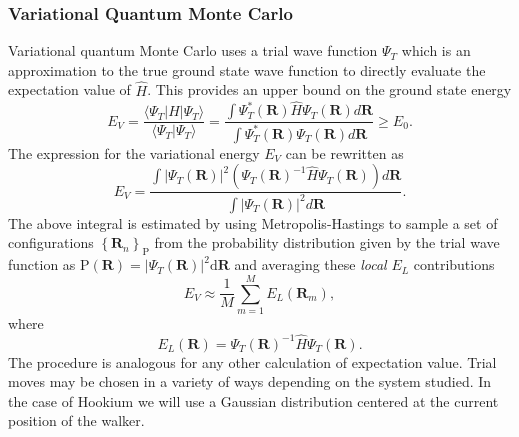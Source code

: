 \subsubsection{Variational Quantum Monte Carlo}
Variational quantum Monte Carlo uses a trial wave function $\Psi_{T}$ which is an approximation to the true ground state wave function to directly evaluate the expectation value of $\hat H$. This provides an upper bound on the ground state energy
\begin{equation}
	\label{eq:variational_princ}
	E_{V}=\frac{\langle \Psi_{T} | H | \Psi_{T} \rangle}{\langle \Psi_{T} | \Psi_{T} \rangle}
	=\frac{\int \Psi_{T}^{*}(\mathbf{R}) \hat{H} \Psi_{T}(\mathbf{R}) d \mathbf{R}}{\int \Psi_{T}^{*}(\mathbf{R}) \Psi_{T}(\mathbf{R}) d \mathbf{R}} \geq E_{0}.
\end{equation}
The expression for the variational energy $E_V$ can be rewritten as
\begin{equation}
	\label{eq:E_V}
	E_{V}=\frac{\int\left|\Psi_{T}(\mathbf{R})\right|^{2}\left(\Psi_{T}(\mathbf{R})^{-1} \hat{H} \Psi_{T}(\mathbf{R})\right) d \mathbf{R}}{\int\left|\Psi_{T}(\mathbf{R})\right|^{2} d \mathbf{R}}.
\end{equation}
The above integral is estimated by using Metropolis-Hastings to sample a set of configurations $\left\{ \mathbf{R}_n \right\}_{\mathrm{P}}$ from the probability distribution given by the trial wave function as $\mathrm{P}(\mathbf{R}) = |\Psi_T(\mathbf{R})|^2 \mathrm{d}\mathbf{R}$ and averaging these \emph{local} $E_L$ contributions
\begin{equation}
	E_{V} \approx \frac{1}{M} \sum_{m=1}^{M} E_{L}\left(\mathbf{R}_{m}\right),
\end{equation}
where
\begin{equation}
	E_{L}(\mathbf{R})=\Psi_{T}(\mathbf{R})^{-1} \hat{H} \Psi_{T}(\mathbf{R}).
\end{equation}
The procedure is analogous for any other calculation of expectation value. Trial moves may be chosen in a variety of ways depending on the system studied. In the case of Hookium we will use a Gaussian distribution centered at the current position of the walker.

